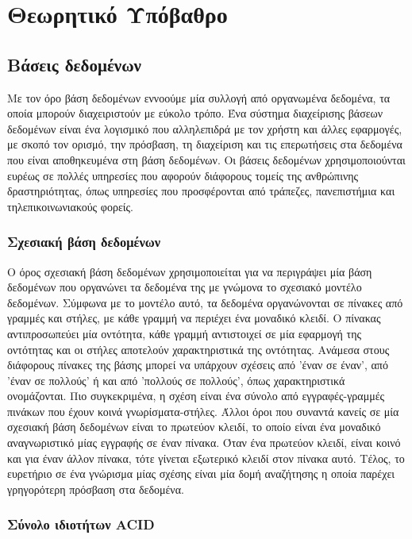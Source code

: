 \chapter{Θεωρητικό Υπόβαθρο}

\section{Βάσεις δεδομένων}

Με τον όρο βάση δεδομένων εννοούμε μία συλλογή από οργανωμένα δεδομένα, τα οποία μπορούν διαχειριστούν με εύκολο τρόπο. Ένα σύστημα διαχείρισης βάσεων δεδομένων 
είναι ένα λογισμικό που αλληλεπιδρά με τον χρήστη και άλλες εφαρμογές, με σκοπό τον ορισμό, την πρόσβαση, τη διαχείριση και τις επερωτήσεις στα δεδομένα που είναι 
αποθηκευμένα στη βάση δεδομένων. Οι βάσεις δεδομένων χρησιμοποιούνται ευρέως σε πολλές υπηρεσίες που αφορούν διάφορους τομείς της ανθρώπινης δραστηριότητας, όπως 
υπηρεσίες που προσφέρονται από τράπεζες, πανεπιστήμια και τηλεπικοινωνιακούς φορείς.

\subsection{Σχεσιακή βάση δεδομένων}

Ο όρος σχεσιακή βάση δεδομένων χρησιμοποιείται για να περιγράψει μία βάση δεδομένων που οργανώνει τα δεδομένα της με γνώμονα το σχεσιακό μοντέλο δεδομένων. Σύμφωνα 
με το μοντέλο αυτό, τα δεδομένα οργανώνονται σε πίνακες από γραμμές και στήλες, με κάθε γραμμή να περιέχει ένα μοναδικό κλειδί. Ο πίνακας αντιπροσωπεύει μία οντότητα, 
κάθε γραμμή αντιστοιχεί σε μία εφαρμογή της οντότητας και οι στήλες αποτελούν χαρακτηριστικά της οντότητας. Ανάμεσα στους διάφορους πίνακες της βάσης μπορεί να υπάρχουν 
σχέσεις από 'έναν σε έναν', από 'έναν σε πολλούς' ή και από 'πολλούς σε πολλούς', όπως χαρακτηριστικά ονομάζονται. Πιο συγκεκριμένα, η σχέση είναι ένα σύνολο από 
εγγραφές-γραμμές πινάκων που έχουν κοινά γνωρίσματα-στήλες. Άλλοι όροι που συναντά κανείς σε μία σχεσιακή βάση δεδομένων είναι το πρωτεύον κλειδί, το οποίο είναι ένα 
μοναδικό αναγνωριστικό μίας εγγραφής σε έναν πίνακα. Όταν ένα πρωτεύον κλειδί, είναι κοινό και για έναν άλλον πίνακα, τότε γίνεται εξωτερικό κλειδί στον πίνακα αυτό. Τέλος, 
το ευρετήριο σε ένα γνώρισμα μίας σχέσης είναι μία δομή αναζήτησης η οποία παρέχει γρηγορότερη πρόσβαση στα δεδομένα.

\subsection{Σύνολο ιδιοτήτων ACID}


